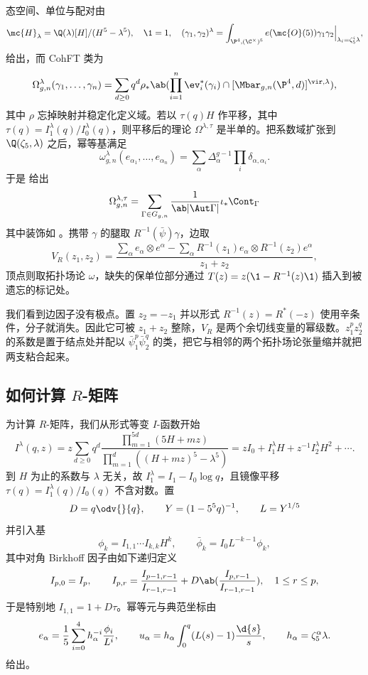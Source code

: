 态空间、单位与配对由
\[ \mc{H}_{\lambda} = \Q(\lambda)[H]/(H^5-\lambda^5), \quad \1 = 1, \quad (\gamma_1,\gamma_2)^{\lambda} = \int_{\P^4, (\C^{\times})^5} e(\mc{O}(5))\gamma_1\gamma_2 \Big|_{\lambda_i = \zeta_5^i\lambda}, \]
给出，而 CohFT 类为
\[ \Omega^{\lambda}_{g,n}(\gamma_1, \ldots, \gamma_n) = \sum_{d \geq 0} q^d \rho_* \ab( \prod_{i=1}^n \ev_i^*(\gamma_i) \cap [\Mbar_{g,n}(\P^4,d)]^{\vir,\lambda}), \]
其中 \(\rho\) 忘掉映射并稳定化定义域。若以 \(\tau(q)H\) 作平移，其中 \(\tau(q) = I^{\lambda}_1(q)/I^{\lambda}_0(q)\)，则平移后的理论 \(\Omega^{\lambda,\tau}\) 是半单的。把系数域扩张到 \(\Q(\zeta_5,\lambda)\) 之后，幂等基满足
\[ \omega^{\lambda}_{g,n}(e_{\alpha_1}, \ldots, e_{\alpha_n}) = \sum_{\alpha}\Delta_{\alpha}^{g-1}\prod_i \delta_{\alpha,\alpha_i}. \]
于是  给出
\[ \Omega^{\lambda,\tau}_{g,n} = \sum_{\Gamma \in G_{g,n}} \frac{1}{\ab|\Aut\Gamma|}\iota_* \Cont_{\Gamma} \]
其中装饰如 。携带 \(\gamma\) 的腿取 \(R^{-1}(\bar{\psi})\gamma\)，边取
\[ V_R(z_1,z_2) = \frac{\sum_{\alpha} e_{\alpha}\otimes e^{\alpha} - \sum_{\alpha} R^{-1}(z_1)e_{\alpha} \otimes R^{-1}(z_2)e^{\alpha}}{z_1+z_2}, \]
顶点则取拓扑场论 \(\omega\)，缺失的保单位部分通过 \(T(z) = z(\1 - R^{-1}(z)\1)\) 插入到被遗忘的标记处。

\begin{rmk}
    我们看到边因子没有极点。置 \(z_2 = -z_1\) 并以形式 \(R^{-1}(z) = R^*(-z)\) 使用辛条件，分子就消失。因此它可被 \(z_1+z_2\) 整除，\(V_R\) 是两个余切线变量的幂级数。\(z_1^p z_2^q\) 的系数是置于结点处并配以 \(\bar{\psi}_1^p \bar{\psi}_2^q\) 的类，把它与相邻的两个拓扑场论张量缩并就把两支粘合起来。
\end{rmk}

\subsection{如何计算 \(R\)-矩阵}%
\label{sub:How to compute the R-matrix (Guo)}

为计算 \(R\)-矩阵，我们从形式等变 \(I\)-函数开始
\[ I^{\lambda}(q,z) = z\sum_{d\geq0}q^d \frac{\prod_{m=1}^{5d}(5H+mz)}{\prod_{m=1}^d ((H+mz)^5 - \lambda^5)} = zI_0 + I_1^{\lambda}H + z^{-1}I_2^{\lambda}H^2 + \cdots. \]
到 \(H\) 为止的系数与 \(\lambda\) 无关，故 \(I_1^{\lambda} = I_1 - I_0 \log q\)，且镜像平移 \(\tau(q) = I_1^{\lambda}(q)/I_0(q)\) 不含对数。置
\[ D = q\odv{}{q}, \qquad Y = (1-5^5q)^{-1}, \qquad L = Y^{1/5} \]
并引入基
\[ \phi_k = I_{1,1}\cdots I_{k,k}H^k, \qquad \bar{\phi}_k = I_0 L^{-k-1}\phi_k, \]
其中对角 Birkhoff 因子由如下递归定义
\[ I_{p,0} = I_p, \qquad I_{p,r} = \frac{I_{p-1,r-1}}{I_{r-1,r-1}} + D \ab( \frac{I_{p,r-1}}{I_{r-1,r-1}}), \quad 1 \leq r \leq p, \]
于是特别地 \(I_{1,1} = 1+D\tau\)。幂等元与典范坐标由
\[ e_{\alpha} = \frac{1}{5}\sum_{i=0}^4 h_{\alpha}^{-i}\frac{\phi_i}{L^i}, \qquad u_{\alpha} = h_{\alpha}\int_0^q (L(s)-1)\frac{\d{s}}{s}, \qquad h_{\alpha} = \zeta_5^{\alpha}\lambda. \]
给出。

